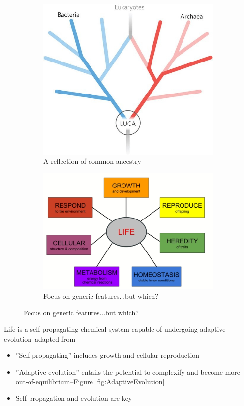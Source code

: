 \documentclass[]{article}
\begin{document}
\begin{figure}[H]
	\begin{subfigure}[b]{0.45\textwidth}
		\centering
		\caption{A reflection of common ancestry}\label{fig:LUCA_common} 
		\includegraphics[width=\textwidth]{LUCA_common}
	\end{subfigure}
	\begin{subfigure}[b]{0.45\textwidth}
		\centering
		\caption{Focus on generic features...but which?}\label{fig:lawki-focus} 
		\includegraphics[width=\textwidth]{lawki-focus}
	\end{subfigure}
\end{figure}

Life is a self-propagating chemical system capable of undergoing adaptive evolution--adapted from \cite{deamer1994origins}
\begin{itemize}
	\item ''Self-propagating'' includes growth and cellular reproduction 
	\item ''Adaptive evolution'' entails the potential to complexify and become more out-of-equilibrium--Figure \ref{fig:AdaptiveEvolution}
	\item Self-propagation and evolution are key
\end{itemize}
\end{document}
